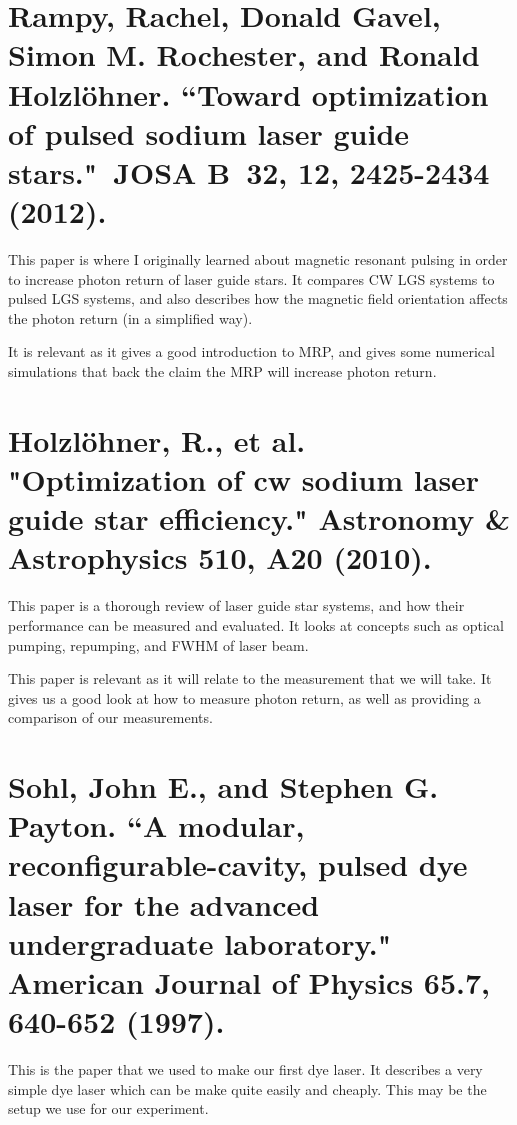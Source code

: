 \documentclass{article}
\begin{document}
%

\section*{Rampy, Rachel, Donald Gavel, Simon M. Rochester, and Ronald Holzlöhner. ``Toward optimization of pulsed sodium laser guide stars." JOSA B 32, 12,  2425-2434 (2012).}

This paper is where I originally learned about magnetic resonant pulsing in order to increase photon return of laser guide stars. It compares CW LGS systems to pulsed LGS systems, and also describes how the magnetic field orientation affects the photon return (in a simplified way).

It is relevant as it gives a good introduction to MRP, and gives some numerical simulations that back the claim the MRP will increase photon return.

%

\section*{Holzlöhner, R., et al. "Optimization of cw sodium laser guide star efficiency." Astronomy \& Astrophysics 510, A20 (2010).}

This paper is a thorough review of laser guide star systems, and how their performance can be measured and evaluated. It looks at concepts such as optical pumping, repumping, and FWHM of laser beam.

This paper is relevant as it will relate to the measurement that we will take. It gives us a good look at how to measure photon return, as well as providing a comparison of our measurements.

%

\section*{Sohl, John E., and Stephen G. Payton. ``A modular, reconfigurable-cavity, pulsed dye laser for the advanced undergraduate laboratory." American Journal of Physics 65.7, 640-652 (1997).}

This is the paper that we used to make our first dye laser. It describes a very simple dye laser which can be make quite easily and cheaply. This may be the setup we use for our experiment.
\end{document}
